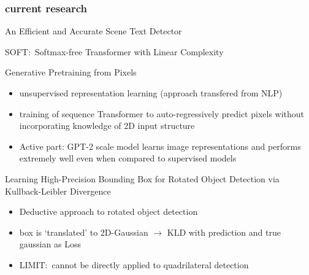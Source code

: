 \subsubsection*{current research}
An Efficient and Accurate Scene Text Detector~\cite{zhou_east_2017}

SOFT:\ Softmax-free Transformer with Linear Complexity~\cite{lu_soft_2021}

Generative Pretraining from Pixels~\cite{chen_generative_nodate}
\begin{itemize}
    \item unsupervised representation learning (approach transfered from NLP)
    \item training of sequence Transformer to auto-regressively predict pixels without incorporating
        knowledge of 2D input structure
    \item Active part: GPT-2 scale model learns image representations and performs extremely well even
        when compared to supervised models
\end{itemize}

Learning High-Precision Bounding Box for Rotated Object Detection via Kullback-Leibler
Divergence~\cite{yang_learning_2021}
\begin{itemize}
    \item Deductive approach to rotated object detection
    \item box is `translated' to 2D-Gaussian $\rightarrow$ KLD with prediction and true gaussian as Loss
    \item LIMIT:\ cannot be directly applied to quadrilateral detection
\end{itemize}


